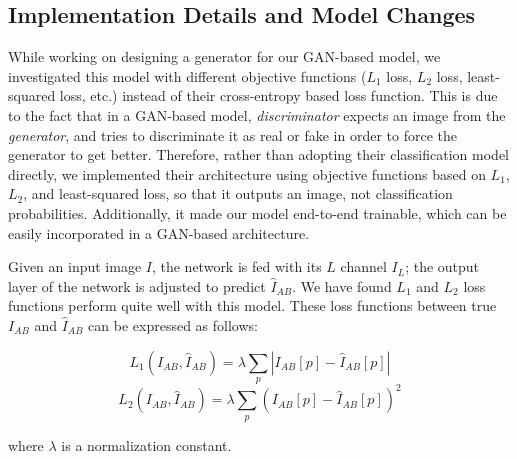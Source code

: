 \documentclass[10pt]{article}
\begin{document}
\subsection{\textbf{Implementation Details and Model Changes}}
While working on designing a generator for our GAN-based model, we investigated this model with different objective functions ($L_1$ loss, $L_2$ loss, least-squared loss, etc.) instead of their cross-entropy based loss function. This is due to the fact that in a GAN-based model, \textit{discriminator} expects an image from the \textit{generator}, 
and tries to discriminate it as real or fake in order to force the generator to get better.  
Therefore, rather than adopting their classification model directly, we implemented their architecture 
using objective functions based on $L_1$, $L_2$, and least-squared loss, so that it outputs an image, not classification probabilities. Additionally, it made our model end-to-end trainable, which can be easily
incorporated in a GAN-based architecture. 

Given an input image $I$, the network is fed with its $L$ channel $I_L$; the output layer of the network is adjusted to predict $\hat{I}_{AB}$. We have found $L_1$ and $L_2$ loss functions perform quite well with this model. These loss functions between true $I_{AB}$ and $\hat{I}_{AB}$ can be expressed as follows:

\[ L_1 (I_{AB}, \hat{I}_{AB}) = \lambda \sum_p | I_{AB}[p] - \hat{I}_{AB}[p] | \]  
\[ L_2 (I_{AB}, \hat{I}_{AB}) = \lambda \sum_p ( I_{AB}[p] - \hat{I}_{AB}[p] )^2 \]  

\noindent where $\lambda$ is a normalization constant.
\end{document}
